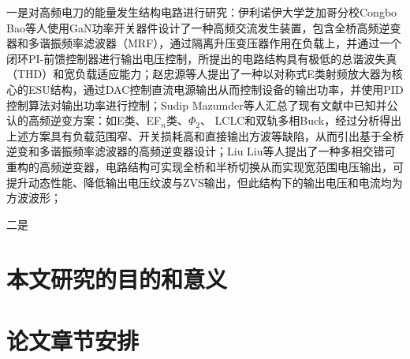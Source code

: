 一是对高频电刀的能量发生结构电路进行研究：伊利诺伊大学芝加哥分校Congbo Bao等人使用GaN功率开关器件设计了一种高频交流发生装置，包含全桥高频逆变器和多谐振频率滤波器（MRF），通过隔离升压变压器作用在负载上，并通过一个闭环PI-前馈控制器进行输出电压控制，所提出的电路结构具有极低的总谐波失真（THD）和宽负载适应能力\cite{Bao_multiresonantfrequency_2022,Bao_ganhemt_2021}；赵忠源等人提出了一种以对称式E类射频放大器为核心的ESU结构，通过DAC控制直流电源输出从而控制设备的输出功率，并使用PID控制算法对输出功率进行控制\cite{ZhaoZhongYuan_yongyudanjiqiegedezhinengdianwaikeshebeideyanzhi_2022}；Sudip Mazumder等人汇总了现有文献中已知并公认的高频逆变方案：如E类、EF$_n$类、$\Phi_{2}$、 LCLC和双轨多相Buck，经过分析得出上述方案具有负载范围窄、开关损耗高和直接输出方波等缺陷，从而引出基于全桥逆变和多谐振频率滤波器的高频逆变器设计\cite{Mazumder_electrosurgery_2023}；Liu Liu等人提出了一种多相交错可重构的高频逆变器，电路结构可实现全桥和半桥切换从而实现宽范围电压输出，可提升动态性能、降低输出电压纹波与ZVS输出，但此结构下的输出电压和电流均为方波波形\cite{Liu_multiphase_2022}；

二是


\section{本文研究的目的和意义}

\section{论文章节安排}